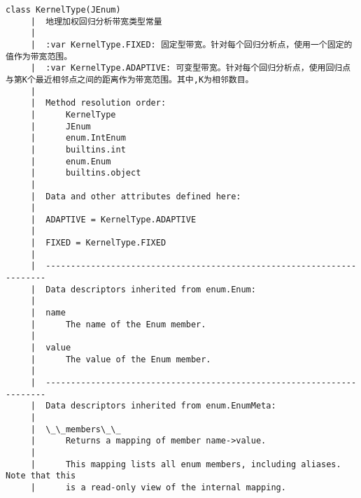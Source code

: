 \documentclass[11pt]{article}
\begin{document}
\begin{Verbatim}[commandchars=\\\{\}]
    class KernelType(JEnum)
     |  地理加权回归分析带宽类型常量
     |  
     |  :var KernelType.FIXED: 固定型带宽。针对每个回归分析点，使用一个固定的值作为带宽范围。
     |  :var KernelType.ADAPTIVE: 可变型带宽。针对每个回归分析点，使用回归点与第K个最近相邻点之间的距离作为带宽范围。其中,K为相邻数目。
     |  
     |  Method resolution order:
     |      KernelType
     |      JEnum
     |      enum.IntEnum
     |      builtins.int
     |      enum.Enum
     |      builtins.object
     |  
     |  Data and other attributes defined here:
     |  
     |  ADAPTIVE = KernelType.ADAPTIVE
     |  
     |  FIXED = KernelType.FIXED
     |  
     |  ----------------------------------------------------------------------
     |  Data descriptors inherited from enum.Enum:
     |  
     |  name
     |      The name of the Enum member.
     |  
     |  value
     |      The value of the Enum member.
     |  
     |  ----------------------------------------------------------------------
     |  Data descriptors inherited from enum.EnumMeta:
     |  
     |  \_\_members\_\_
     |      Returns a mapping of member name->value.
     |      
     |      This mapping lists all enum members, including aliases. Note that this
     |      is a read-only view of the internal mapping.
    

\end{Verbatim}
\end{document}
